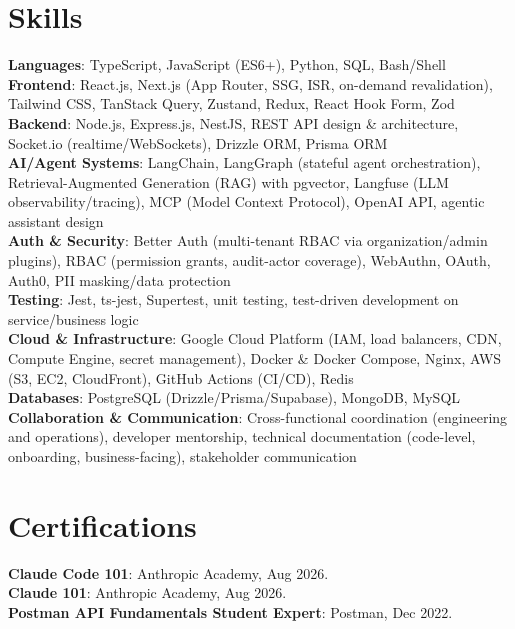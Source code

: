 \documentclass[letterpaper,11pt]{article}
\begin{document}
\section{Skills}
 \begin{itemize}[leftmargin=0.15in, label={}]
    \small{\item{
     \textbf{Languages}{: TypeScript, JavaScript (ES6+), Python, SQL, Bash/Shell} \\
     \textbf{Frontend}{: React.js, Next.js (App Router, SSG, ISR, on-demand revalidation), Tailwind CSS, TanStack Query, Zustand, Redux, React Hook Form, Zod} \\
     \textbf{Backend}{: Node.js, Express.js, NestJS, REST API design \& architecture, Socket.io (realtime/WebSockets), Drizzle ORM, Prisma ORM} \\
     \textbf{AI/Agent Systems}{: LangChain, LangGraph (stateful agent orchestration), Retrieval-Augmented Generation (RAG) with pgvector, Langfuse (LLM observability/tracing), MCP (Model Context Protocol), OpenAI API, agentic assistant design} \\
     \textbf{Auth \& Security}{: Better Auth (multi-tenant RBAC via organization/admin plugins), RBAC (permission grants, audit-actor coverage), WebAuthn, OAuth, Auth0, PII masking/data protection} \\
     \textbf{Testing}{: Jest, ts-jest, Supertest, unit testing, test-driven development on service/business logic} \\
     \textbf{Cloud \& Infrastructure}{: Google Cloud Platform (IAM, load balancers, CDN, Compute Engine, secret management), Docker \& Docker Compose, Nginx, AWS (S3, EC2, CloudFront), GitHub Actions (CI/CD), Redis} \\
     \textbf{Databases}{: PostgreSQL (Drizzle/Prisma/Supabase), MongoDB, MySQL} \\
     \textbf{Collaboration \& Communication}{: Cross-functional coordination (engineering and operations), developer mentorship, technical documentation (code-level, onboarding, business-facing), stakeholder communication}
    }}
 \end{itemize}


\section{Certifications}
 \begin{itemize}[leftmargin=0.15in, label={}]
    \small{\item{
     \textbf{Claude Code 101}: Anthropic Academy, Aug 2026. \\
     \textbf{Claude 101}: Anthropic Academy, Aug 2026. \\
     \textbf{Postman API Fundamentals Student Expert}: Postman, Dec 2022.
    }}
 \end{itemize}


\end{document}

